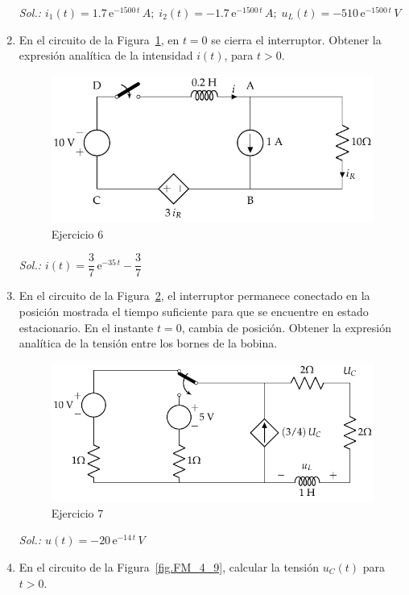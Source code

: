 \begin{enumerate}
	    \emph{Sol.: $i_1(t)=1.7\,\mathrm{e}^{-1500\,t}\,A;\;i_2(t)=-1.7\,\mathrm{e}^{-1500\,t}\,A;\; u_L(t)=-510\,\mathrm{e}^{-1500\,t}\,V$}
	    \item En el circuito de la Figura~\ref{fig.ej6_BT4}, en $t = 0$ se cierra el interruptor. Obtener la expresión analítica de la intensidad $i(t)$, para $t > 0$.
	    \begin{figure}[H]
	    \label{fig.ej6_BT4}
	        \centering
	        \includegraphics{../figs/ej6_BT4.pdf}
	        \caption{Ejercicio 6}
	    \end{figure}
	    \emph{Sol.: $i(t)=\dfrac{3}{7}\,\mathrm{e}^{-35\,t}-\dfrac{3}{7}$}
	    \item En el circuito de la Figura~\ref{fig.ej7_BT4}, el interruptor permanece conectado en la posición mostrada el tiempo suficiente para que se encuentre en estado estacionario. En el instante $t=0$, cambia de posición. Obtener la expresión analítica de la tensión entre los bornes de la bobina. 
	    \begin{figure}[H]
	        \centering
	        \includegraphics{../figs/ej7_BT4.pdf}
	        \caption{Ejercicio 7}
	        \label{fig.ej7_BT4}
	    \end{figure}
	    \emph{Sol.: $u(t)=-20\,\mathrm{e}^{-14\,t}\,V$}
	    \item En el circuito de la Figura~\ref{fig.FM_4_9}, calcular la tensión $u_C(t)$ para $t > 0$.\\

\end{enumerate}
